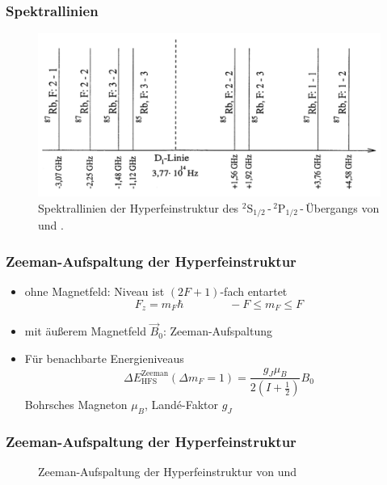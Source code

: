  

\begin{frame}
\frametitle{Spektrallinien}
\begin{figure}
    \centering
    \includegraphics[width=\textwidth]{../img/HFSspect_theo.png}
    \caption{Spektrallinien der Hyperfeinstruktur des ${}^2\text{S}_{1/2}$\,-\,${}^2\text{P}_{1/2}$\,-\,Übergangs
    von  und .}  %
\end{figure}
\end{frame}

\begin{frame}
\frametitle{Zeeman-Aufspaltung der Hyperfeinstruktur}
\begin{itemize}
    \item<1-> ohne Magnetfeld: Niveau ist $(2F+1)$-fach entartet
    \begin{equation*}
        F_z = m_F \hbar \qquad \qquad -F \leq m_F \leq F
    \end{equation*}
    \item<2-> mit äußerem Magnetfeld $\vec{B}_0$: Zeeman-Aufspaltung
    \item<3-> Für benachbarte Energieniveaus
    \begin{equation*}
        \Delta E_\text{HFS}^\text{Zeeman}(\Delta m_F = 1) = \frac{g_J \mu_B}{2 \left( I + \frac{1}{2} \right) } B_0
    \end{equation*}
    Bohrsches Magneton $\mu_B$, Landé-Faktor $g_J$
\end{itemize}
\end{frame}

\begin{frame}
\frametitle{Zeeman-Aufspaltung der Hyperfeinstruktur}


\begin{figure}
    \centering
    \def\svgwidth{\textwidth}
    
    \caption{Zeeman-Aufspaltung der Hyperfeinstruktur von  und }
\end{figure}

\end{frame}




